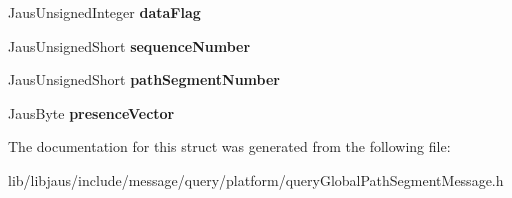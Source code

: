 \begin{DoxyCompactItemize}
\item 
\hypertarget{struct_query_global_path_segment_message_struct_a34642185cd2d03e2b274beba46d08a40}{\-Jaus\-Unsigned\-Integer {\bfseries data\-Flag}}\label{struct_query_global_path_segment_message_struct_a34642185cd2d03e2b274beba46d08a40}

\item 
\hypertarget{struct_query_global_path_segment_message_struct_a330af755c58e5eff6528c72c0b70d27b}{\-Jaus\-Unsigned\-Short {\bfseries sequence\-Number}}\label{struct_query_global_path_segment_message_struct_a330af755c58e5eff6528c72c0b70d27b}

\item 
\hypertarget{struct_query_global_path_segment_message_struct_a848ab498229784e01e904cd56744339f}{\-Jaus\-Unsigned\-Short {\bfseries path\-Segment\-Number}}\label{struct_query_global_path_segment_message_struct_a848ab498229784e01e904cd56744339f}

\item 
\hypertarget{struct_query_global_path_segment_message_struct_a1393da3049726f91da5662f0af19842f}{\-Jaus\-Byte {\bfseries presence\-Vector}}\label{struct_query_global_path_segment_message_struct_a1393da3049726f91da5662f0af19842f}

\end{DoxyCompactItemize}


\-The documentation for this struct was generated from the following file\-:\begin{DoxyCompactItemize}
\item 
lib/libjaus/include/message/query/platform/query\-Global\-Path\-Segment\-Message.\-h\end{DoxyCompactItemize}
